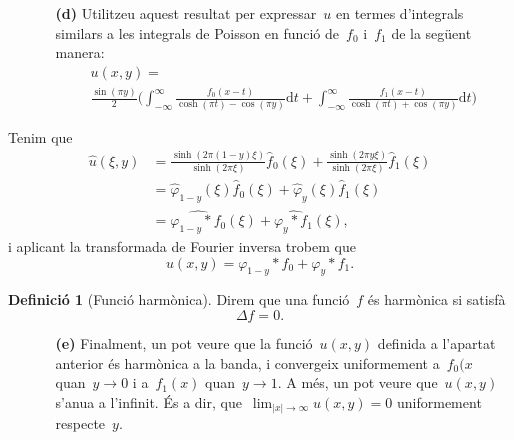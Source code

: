 \documentclass[a4paper]{article}
\theoremstyle{plain}
\theoremstyle{definition}
\newtheorem{definition}{Definició}
\providecommand{\uppi}{\pi}
\newcommand{\diff}{\mathrm{d}}
\newcommand{\abs}[1]{\lvert{#1}\rvert}
\begin{document}
\begin{enumerate}
    \item[]\begin{enumerate}
        \item[\textbf{(d)}] Utilitzeu aquest resultat per expressar~\(u\) en
            termes d'integrals similars a les integrals de Poisson en funció
            de~\(f_{0}\) i~\(f_{1}\) de la següent manera:
            \begin{multline*}
                u(x,y)
                = \\
                \frac{\sin(\uppi y)}{2}
                \biggl(
                    \int_{-\infty}^{\infty}
                    \frac{f_{0}(x-t)}{\cosh(\uppi t)-\cos(\uppi y)}
                    \diff t
                    +
                    \int_{-\infty}^{\infty}
                    \frac{f_{1}(x-t)}{\cosh(\uppi t)+\cos(\uppi y)}
                    \diff t
                \biggr)
            \end{multline*}
    \end{enumerate}
\end{enumerate}

Tenim que
\begin{align*}
    \widehat{u}(\xi,y) &= \frac{\sinh(2\uppi(1-y)\xi)}{\sinh(2\uppi\xi)}
                          \widehat{f}_{0}(\xi)
                          +
                          \frac{\sinh(2\uppi y\xi)}{\sinh(2\uppi\xi)}
                          \widehat{f}_{1}(\xi) \\
                       &= \widehat{\varphi}_{1-y}(\xi)
                          \widehat{f}_{0}(\xi)
                          +
                          \widehat{\varphi}_{y}(\xi)
                          \widehat{f}_{1}(\xi) \\
                       &= \widehat{\varphi_{1-y}\ast f_{0}}(\xi)
                          +
                          \widehat{\varphi_{y}\ast f_{1}}(\xi),
\end{align*}
i aplicant la transformada de Fourier inversa trobem que
\[
    u(x,y)
    =
    \varphi_{1-y}\ast f_{0}
    +
    \varphi_{y}\ast f_{1}.
\]

\begin{definition}[Funció harmònica]
    Direm que una funció~\(f\) és harmònica si satisfà
    \[
        \Delta f = 0.
    \]
\end{definition}

\begin{enumerate}
    \item[]\begin{enumerate}
        \item[\textbf{(e)}] Finalment, un pot veure que la funció~\(u(x,y)\)
            definida a l'apartat anterior és harmònica a la banda, i convergeix
            uniformement a~\(f_{0}(x\) quan~\(y\to0\) i a~\(f_{1}(x)\)
            quan~\(y\to1\).
            A més, un pot veure que~\(u(x,y)\) s'anu{\lgem}a a l'infinit. És a
            dir, que~\(\lim_{\abs{x}\to\infty}u(x,y)=0\) uniformement
            respecte~\(y\).
    \end{enumerate}
\end{enumerate}
\end{document}
